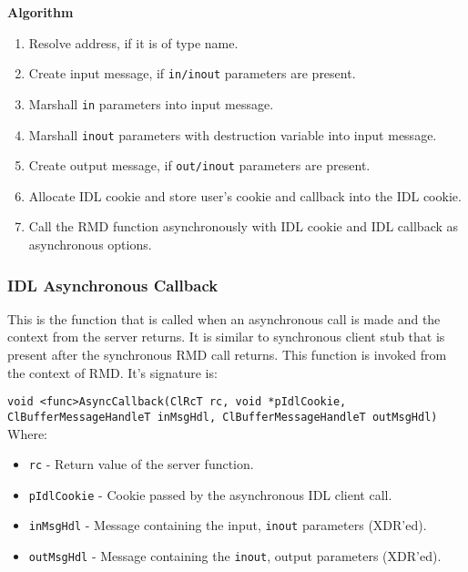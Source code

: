 \begin{flushleft}
\textbf{Algorithm}
\begin{enumerate}
\item
Resolve address, if it is of type name.
\item
Create input message, if {\tt{in/inout}} parameters are present.
\item
Marshall {\tt{in}} parameters into input message.
\item
Marshall {\tt{inout}} parameters with destruction variable into input message.
\item
Create output message, if {\tt{out/inout}} parameters are present.
\item
Allocate IDL cookie and store user's cookie and callback into the IDL cookie.
\item
Call the RMD function asynchronously with IDL cookie and IDL callback as asynchronous options.
\end{enumerate}

\subsubsection{IDL Asynchronous Callback}

This is the function that is called when an asynchronous call is made and the context from the server returns. It is similar to synchronous client stub 
that is present after the synchronous RMD call returns. This function is invoked from the context of RMD. It's signature is:\par
{\tt{void <func>AsyncCallback(ClRcT rc, void *pIdlCookie, ClBufferMessageHandleT inMsgHdl, ClBufferMessageHandleT outMsgHdl)}}
Where:
\begin{itemize}
\item
{\tt{rc}} - Return value of the server function.
\item
{\tt{pIdlCookie}} - Cookie passed by the asynchronous IDL client call.
\item
{\tt{inMsgHdl}} - Message containing the input, {\tt{inout}} parameters (XDR'ed).
\item
{\tt{outMsgHdl}} - Message containing the {\tt{inout}}, output parameters (XDR'ed).
\end{itemize}


\end{flushleft}
